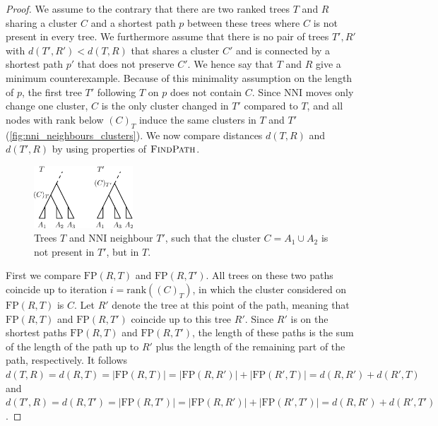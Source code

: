 \documentclass[11pt]{amsart}
\newcommand{\findpath}{\textsc{FindPath}}
\newcommand{\rank}{\mathrm{rank}}
\newcommand{\nni}{\mathrm{NNI}}
\newcommand{\fp}{\mathrm{FP}}
\begin{document}
\begin{proof}
	We assume to the contrary that there are two ranked trees $T$ and $R$ sharing a cluster $C$ and a shortest path $p$ between these trees where $C$ is not present in every tree.
	We furthermore assume that there is no pair of trees $T',R'$ with $d(T',R') < d(T,R)$ that shares a cluster $C'$ and is connected by a shortest path $p'$ that does not preserve $C'$.
	We hence say that $T$ and $R$ give a minimum counterexample.
	Because of this minimality assumption on the length of $p$, the first tree $T'$ following $T$ on $p$ does not contain $C$.
	Since $\nni$ moves only change one cluster, $C$ is the only cluster changed in $T'$ compared to $T$, and all nodes with rank below $(C)_T$ induce the same clusters in $T$ and $T'$ (\autoref{fig:nni_neighbours_clusters}).
	We now compare distances $d(T,R)$ and $d(T',R)$ by using properties of $\findpath$.

	\begin{figure}[ht]
		\includegraphics[width=0.33\textwidth]{nni_neighbours_clusters.eps}
		\caption{Trees $T$ and $\nni$ neighbour $T'$, such that the cluster $C = A_1 \cup A_2$ is not present in $T'$, but in $T$.}
		\label{fig:nni_neighbours_clusters}
	\end{figure}

	First we compare $\fp(R,T)$ and $\fp(R,T')$.
	All trees on these two paths coincide up to iteration $i = \rank((C)_T)$, in which the cluster considered on $\fp(R,T)$ is $C$.
	Let $R'$ denote the tree at this point of the path, meaning that $\fp(R,T)$ and $\fp(R,T')$ coincide up to this tree $R'$.
	Since $R'$ is on the shortest paths $\fp(R,T)$ and $\fp(R,T')$, the length of these paths is the sum of the length of the path up to $R'$ plus the length of the remaining part of the path, respectively.
	It follows $d(T,R) = d(R,T) = |\fp(R,T)| = |\fp(R,R')| + |\fp(R',T)| = d(R,R') + d(R', T)$ and $d(T',R) = d(R,T') = |\fp(R,T')| = |\fp(R,R')| + |\fp(R',T')| =  d(R,R') + d(R', T')$.


\end{proof}
\end{document}

